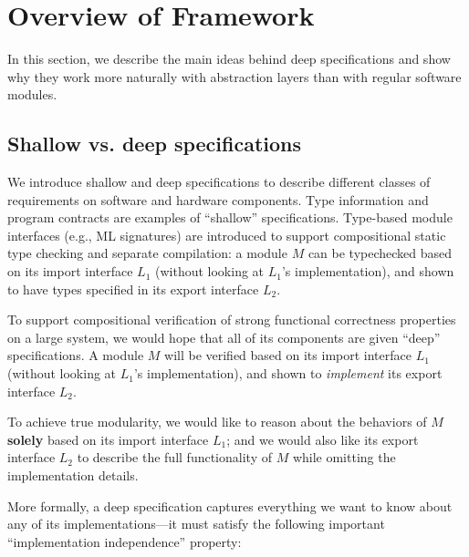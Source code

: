 
\chapter{Overview of \CTOS{} Framework}
\label{chap:overview}

In this section, we describe the main ideas behind deep
specifications and show why they work more naturally with
abstraction layers than with regular software modules.

\section{Shallow vs. deep specifications}
We introduce shallow and deep specifications to describe different
classes of requirements on software and hardware components.  Type
information and program contracts are examples of ``shallow''
specifications. Type-based module interfaces (e.g., ML signatures) are
introduced to support compositional static type checking and separate
compilation: a module $M$ can be typechecked based on its import
interface $L_1$ (without looking at $L_1$'s implementation), and shown to
have types specified in its export interface $L_2$.

To support compositional verification of strong functional correctness
properties on a large system, we would hope that all of its components
are given ``deep'' specifications.  A module $M$ will be verified based on
its import interface $L_1$ (without looking at $L_1$'s
implementation), and shown to {\em implement} its export interface 
$L_2$.

To achieve true modularity, we would like to reason about the
behaviors of $M$ {\bf solely} based on its import interface $L_1$; and
we would also like its export interface $L_2$ to describe the full
functionality of $M$ while omitting the implementation details.


More formally, a deep specification captures everything we want to know
about any of its implementations---it must satisfy the following
important ``implementation independence'' property:

